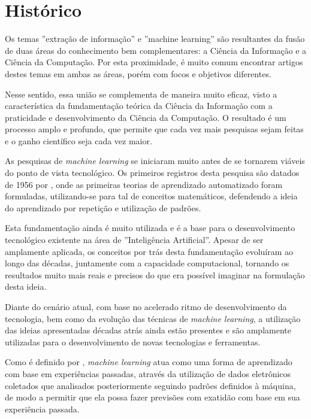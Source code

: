 \section{Histórico}

Os temas ''extração de informação'' e ''machine learning'' são resultantes da fusão de duas áreas do conhecimento bem complementares: a Ciência da Informação e a Ciência da Computação. Por esta proximidade, é muito comum encontrar artigos destes temas em ambas as áreas, porém com focos e objetivos diferentes.

Nesse sentido, essa união se complementa de maneira muito eficaz, visto a característica da fundamentação teórica da Ciência da Informação com a praticidade e desenvolvimento da Ciência da Computação. O resultado é um processo amplo e profundo, que permite que cada vez mais pesquisas sejam feitas e o ganho científico seja cada vez maior.

As pesquisas de \textit{machine learning} se iniciaram muito antes de se tornarem viáveis do ponto de vista tecnológico. Os primeiros registros desta pesquisa são datados de 1956 por \cite{machine-learning}, onde as primeiras teorias de aprendizado automatizado foram formuladas, utilizando-se para tal de conceitos matemáticos, defendendo a ideia do aprendizado por repetição e utilização de padrões.

Esta fundamentação ainda é muito utilizada e é a base para o desenvolvimento tecnológico existente na área de ''Inteligência Artificial''. Apesar de ser amplamente aplicada, os conceitos por trás desta fundamentação evoluíram ao longo das décadas, juntamente com a capacidade computacional, tornando os resultados muito mais reais e precisos do que era possível imaginar na formulação desta ideia.

Diante do cenário atual, com base no acelerado ritmo de desenvolvimento da tecnologia, bem como da evolução das técnicas de \textit{machine learning}, a utilização das ideias apresentadas décadas atrás ainda estão presentes e são amplamente utilizadas para o desenvolvimento de novas tecnologias e ferramentas.

Como é definido por \cite{foundations-machine-learning}, \textit{machine learning} atua como uma forma de aprendizado com base em experiências passadas, através da utilização de dados eletrônicos coletados que analisados posteriormente seguindo padrões definidos à máquina, de modo a permitir que ela possa fazer previsões com exatidão com base em sua experiência passada.

